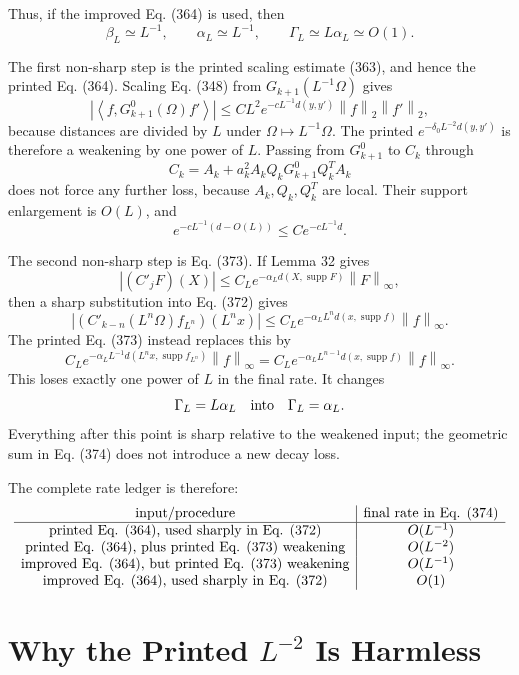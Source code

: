 \documentclass[11pt]{article}
\newcommand{\supp}{\operatorname{supp}}
\newcommand{\ip}[2]{\left\langle #1,#2\right\rangle}
\newcommand{\norm}[1]{\left\|#1\right\|}
\begin{document}
Thus, if the improved Eq. (364) is used, then
\[
  \beta_L\simeq L^{-1},\qquad
  \alpha_L\simeq L^{-1},\qquad
  \Gamma_L\simeq L\alpha_L\simeq O(1).
\]

The first non-sharp step is the printed scaling estimate (363), and hence the
printed Eq. (364).  Scaling Eq. (348) from \(G_{k+1}(L^{-1}\Omega)\) gives
\[
  |\ip{f}{G^0_{k+1}(\Omega)f'}|
  \le
  C L^2 e^{-cL^{-1}d(y,y')}\norm{f}_2\norm{f'}_2,
\]
because distances are divided by \(L\) under \(\Omega\mapsto L^{-1}\Omega\).
The printed \(e^{-\delta_0L^{-2}d(y,y')}\) is therefore a weakening by one power
of \(L\).  Passing from \(G^0_{k+1}\) to \(C_k\) through
\[
  C_k=A_k+a_k^2A_kQ_kG^0_{k+1}Q_k^TA_k
\]
does not force any further loss, because \(A_k,Q_k,Q_k^T\) are local.  Their
support enlargement is \(O(L)\), and
\[
  e^{-cL^{-1}(d-O(L))}\le C e^{-cL^{-1}d}.
\]

The second non-sharp step is Eq. (373).  If Lemma 32 gives
\[
  |(C'_jF)(X)|\le C_Le^{-\alpha_Ld(X,\supp F)}\norm{F}_\infty,
\]
then a sharp substitution into Eq. (372) gives
\[
  |(C'_{k-n}(L^n\Omega)f_{L^n})(L^nx)|
  \le
  C_Le^{-\alpha_LL^nd(x,\supp f)}\norm{f}_\infty.
\]
The printed Eq. (373) instead replaces this by
\[
  C_Le^{-\alpha_LL^{-1}d(L^nx,\supp f_{L^n})}\norm{f}_\infty
  =
  C_Le^{-\alpha_LL^{n-1}d(x,\supp f)}\norm{f}_\infty.
\]
This loses exactly one power of \(L\) in the final rate.  It changes
\[
  \Gamma_L=L\alpha_L
  \quad\hbox{into}\quad
  \Gamma_L=\alpha_L.
\]
Everything after this point is sharp relative to the weakened input; the
geometric sum in Eq. (374) does not introduce a new decay loss.

The complete rate ledger is therefore:
\[
\begin{array}{c|c}
\hbox{input/procedure} & \hbox{final rate in Eq. (374)}\\
\hline
\hbox{printed Eq. (364), used sharply in Eq. (372)} & O(L^{-1})\\
\hbox{printed Eq. (364), plus printed Eq. (373) weakening} & O(L^{-2})\\
\hbox{improved Eq. (364), but printed Eq. (373) weakening} & O(L^{-1})\\
\hbox{improved Eq. (364), used sharply in Eq. (372)} & O(1)
\end{array}
\]

\section*{Why the Printed \(L^{-2}\) Is Harmless}
\end{document}
